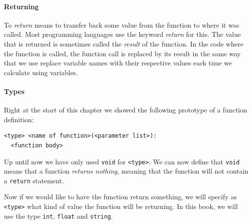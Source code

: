 \paragraph{Returning}

To \emph{return} means to transfer back some value from the function to where it was called. Most programming languages use the keyword \emph{return} for this. The value that is returned is sometimes called the \emph{result} of the function. In the code where the function is called, the function call is replaced by its result in the same way that we use replace variable names with their respective values each time we calculate using variables.

\paragraph{Types}

Right at the start of this chapter we showed the following prototype of a function definition:

\begin{verbatim}
<type> <name of function>(<parameter list>):
  <function body>
\end{verbatim}

Up until now we have only used \texttt{void} for \texttt{<type>}. We can now define that \texttt{void} means that a function \emph{returns nothing}, meaning that the function will not contain a \texttt{return} statement.

Now if we would like to have the function return something, we will specify as \texttt{<type>} what kind of value the function will be returning. In this book, we will use the type \texttt{int}, \texttt{float} and \texttt{string}.

